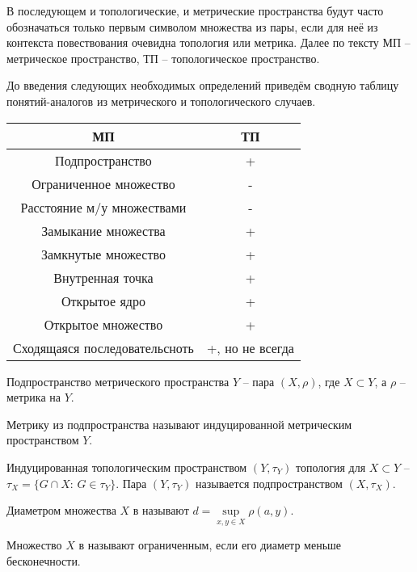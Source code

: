 В последующем и топологические, и метрические пространства будут часто обозначаться только первым символом множества из пары, если для неё из контекста повествования очевидна
 топология или метрика. Далее по тексту МП -- метрическое пространство, ТП -- топологическое пространство.

До введения следующих необходимых определений приведём сводную таблицу понятий-аналогов из метрического и топологического случаев.

\begin{center}
\begin{tabular}{ |c|c| }
    \hline
    \bf{МП} & \bf{ТП} \\
    \hline
    Подпространство & + \\
    Ограниченное множество & - \\
    Расстояние м/у множествами & - \\
    Замыкание множества & + \\
    Замкнутые множество & + \\
    Внутренная точка & + \\
    Открытое ядро & + \\
    Открытое множество & + \\
    Сходящаяся последовательсноть & +, но не всегда \\
    \hline
    
\end{tabular}
\end{center}

\begin{Def}
    Подпространство метрического пространства $Y$ -- пара $(X, \rho)$, где $X \subset Y$, а $\rho$ -- метрика на $Y$.
\end{Def}

Метрику из подпространства называют индуцированной метрическим пространством $Y$.

\begin{Def}
    Индуцированная топологическим пространством $\left( Y, \tau_Y \right)$ топология для $X \subset Y$ -- $\tau_X = \{ G \cap X :\, G \in \tau_Y \}$.
    Пара $(Y, \tau_Y)$ называется подпространством $\left(X, \tau_X \right)$.
\end{Def}

\begin{Def}
    Диаметром множества $X$ в \MS называют $d = \sup\limits_{x, y \in X} \rho(a, y)$.
\end{Def}

\begin{Def}
    Множество $X$ в \MS называют ограниченным, если его диаметр меньше бесконечности.
\end{Def}

